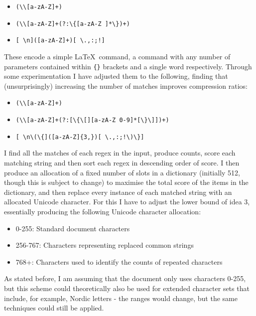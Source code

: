 \documentclass[11pt]{article} %
\begin{document}
\begin{itemize}
	\item \verb|(\\[a-zA-Z]+)|
	\item \verb|(\\[a-zA-Z]+(?:\{[a-zA-Z ]*\})+)|
	\item \verb|[ \n]([a-zA-Z]+)[ \.,:;!]|
\end{itemize}

These encode a simple \rmfamily\LaTeX\normalfont\, command, a command with any number of parameters contained within \verb|{}| brackets and a single word respectively. Through some experimentation I have adjusted them to the following, finding that (unsurprisingly) increasing the number of matches improves compression ratios:

\begin{itemize}
	\item \verb|(\\[a-zA-Z]+)|
	\item \verb|(\\[a-zA-Z]+(?:[\{\[][a-zA-Z 0-9]*[\}\]])+)|
	\item \verb|[ \n\(\{]([a-zA-Z]{3,})[ \.,:;!\)\}]|
\end{itemize}

I find all the matches of each regex in the input, produce counts, score each matching string and then sort each regex in descending order of score. I then produce an allocation of a fixed number of slots in a dictionary (initially 512, though this is subject to change) to maximise the total score of the items in the dictionary, and then replace every instance of each matched string with an allocated Unicode character. For this I have to adjust the lower bound of idea 3, essentially producing the following Unicode character allocation:

\begin{itemize}
	\item 0-255: Standard document characters
	\item 256-767: Characters representing replaced common strings
	\item 768+: Characters used to identify the counts of repeated characters
\end{itemize}

As stated before, I am assuming that the document only uses characters 0-255, but this scheme could theoretically also be used for extended character sets that include, for example, Nordic letters - the ranges would change, but the same techniques could still be applied.
\end{document}

